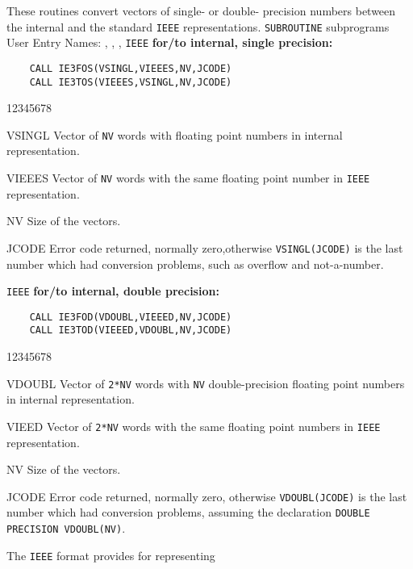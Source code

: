                       
 
\Submitter{}                                 
               
These routines convert vectors of single- or double- precision numbers
between the internal and the standard {\tt IEEE} representations.
\Structure
{\tt SUBROUTINE} subprograms \\
User Entry Names: , , ,
\Usage
{\tt IEEE} {\bf for/to internal, single precision:}
\begin{verbatim}
    CALL IE3FOS(VSINGL,VIEEES,NV,JCODE)
    CALL IE3TOS(VIEEES,VSINGL,NV,JCODE)
\end{verbatim}
\begin{DLtt}{12345678}
\item [VSINGL] Vector of {\tt NV} words with floating point numbers
in internal representation.
\item [VIEEES] Vector of {\tt NV} words with the same floating point
number in {\tt IEEE} representation.
\item [NV] Size of the vectors.
\item [JCODE] Error code returned, normally zero,otherwise
{\tt VSINGL(JCODE)} is the last number which had conversion problems,
such as overflow and not-a-number.
\end{DLtt}
{\tt IEEE} {\bf for/to internal, double precision:}
\begin{verbatim}
    CALL IE3FOD(VDOUBL,VIEEED,NV,JCODE)
    CALL IE3TOD(VIEEED,VDOUBL,NV,JCODE)
\end{verbatim}
\begin{DLtt}{12345678}
\item [VDOUBL] Vector of {\tt 2*NV} words with {\tt NV} double-precision
floating point numbers in internal representation.
\item [VIEED] Vector of {\tt 2*NV} words with the same floating point
numbers in {\tt IEEE} representation.
\item [NV] Size of the vectors.
\item [JCODE] Error code returned, normally zero, otherwise
{\tt VDOUBL(JCODE)} is the last number which had conversion problems,
assuming the declaration {\tt DOUBLE PRECISION VDOUBL(NV)}.
\end{DLtt}
\Notes
The {\tt IEEE} format provides for representing
